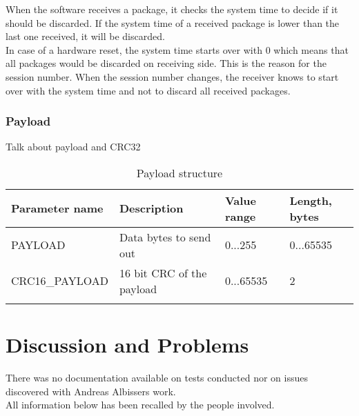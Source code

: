 When the software receives a package, it checks the system time to decide if it should be discarded. If the system time of a received package is lower than the last one received, it will be discarded.\\
In case of a hardware reset, the system time starts over with 0 which means that all packages would be discarded on receiving side. This is the reason for the session number. When the session number changes, the receiver knows to start over with the system time and not to discard all received packages.\\
%
\subsubsection{Payload}
Talk about payload and CRC32
%
%
\begin{center}
    \begin{longtable}{p{3cm}p{8cm}p{2cm}p{1cm}}
        \hline
        \textbf{Parameter name} & \textbf{Description} & \textbf{Value range} & \textbf{Length, bytes} \\
        \hline
        PAYLOAD & Data bytes to send out & 0...255 & 0...65535\\
        \hline
        CRC16\_PAYLOAD &  16 bit CRC of the payload & 0...65535 & 2\\
        \hline
        \caption{Payload structure}
        \label{tab:tabPayloadStructure}    
    \end{longtable}
\end{center}
%
%
%
%
%
\section{Discussion and Problems} \label{sec:txtTeensy3.1SoftwareProblems}
There was no documentation available on tests conducted nor on issues discovered with Andreas Albissers work.\\
All information below has been recalled by the people involved.\\
%
%
